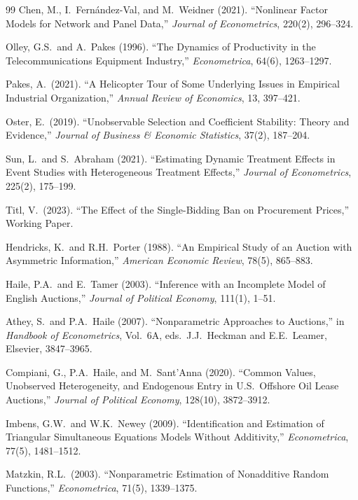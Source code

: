 \documentclass[11pt]{article}
\begin{document}
\begin{thebibliography}{99}
 Chen, M., I.\ Fern\'{a}ndez-Val, and M.\ Weidner (2021). ``Nonlinear Factor Models for Network and Panel Data,'' \emph{Journal of Econometrics}, 220(2), 296--324.

 Olley, G.S.\ and A.~Pakes (1996). ``The Dynamics of Productivity in the Telecommunications Equipment Industry,'' \emph{Econometrica}, 64(6), 1263--1297.

 Pakes, A.\ (2021). ``A Helicopter Tour of Some Underlying Issues in Empirical Industrial Organization,'' \emph{Annual Review of Economics}, 13, 397--421.

 Oster, E.\ (2019). ``Unobservable Selection and Coefficient Stability: Theory and Evidence,'' \emph{Journal of Business \& Economic Statistics}, 37(2), 187--204.

 Sun, L.\ and S.\ Abraham (2021). ``Estimating Dynamic Treatment Effects in Event Studies with Heterogeneous Treatment Effects,'' \emph{Journal of Econometrics}, 225(2), 175--199.

 Titl, V.\ (2023). ``The Effect of the Single-Bidding Ban on Procurement Prices,'' Working Paper.

 Hendricks, K.\ and R.H.\ Porter (1988). ``An Empirical Study of an Auction with Asymmetric Information,'' \emph{American Economic Review}, 78(5), 865--883.

 Haile, P.A.\ and E.\ Tamer (2003). ``Inference with an Incomplete Model of English Auctions,'' \emph{Journal of Political Economy}, 111(1), 1--51.

 Athey, S.\ and P.A.\ Haile (2007). ``Nonparametric Approaches to Auctions,'' in \emph{Handbook of Econometrics}, Vol.~6A, eds.\ J.J.\ Heckman and E.E.\ Leamer, Elsevier, 3847--3965.

 Compiani, G., P.A.\ Haile, and M.\ Sant'Anna (2020). ``Common Values, Unobserved Heterogeneity, and Endogenous Entry in U.S.\ Offshore Oil Lease Auctions,'' \emph{Journal of Political Economy}, 128(10), 3872--3912.

 Imbens, G.W.\ and W.K.\ Newey (2009). ``Identification and Estimation of Triangular Simultaneous Equations Models Without Additivity,'' \emph{Econometrica}, 77(5), 1481--1512.

 Matzkin, R.L.\ (2003). ``Nonparametric Estimation of Nonadditive Random Functions,'' \emph{Econometrica}, 71(5), 1339--1375.


\end{thebibliography}
\end{document}
